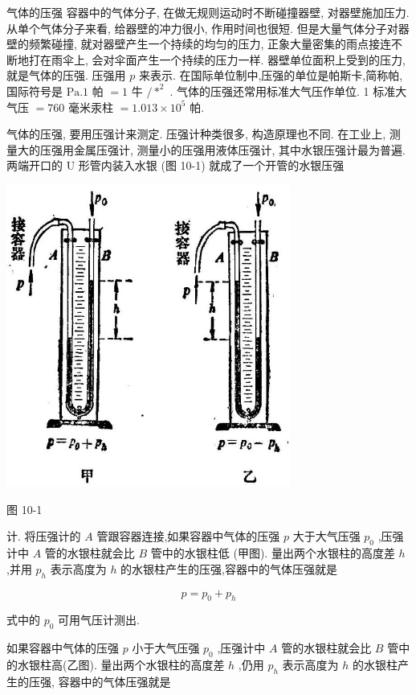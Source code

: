 \documentclass[10pt]{article}
\begin{document}
气体的压强 容器中的气体分子, 在做无规则运动时不断碰撞器壁, 对器壁施加压力. 从单个气体分子来看, 给器壁的冲力很小, 作用时间也很短. 但是大量气体分子对器壁的频繁碰撞, 就对器壁产生一个持续的均匀的压力, 正象大量密集的雨点接连不断地打在雨伞上, 会对伞面产生一个持续的压力一样. 器壁单位面积上受到的压力, 就是气体的压强. 压强用 \(p\) 来表示. 在国际单位制中,压强的单位是帕斯卡,简称帕,国际符号是 \(\mathrm{{Pa}}{.1}\) 帕 \(= 1\) 牛 \(/{ * }^{2}\) . 气体的压强还常用标准大气压作单位. 1 标准大气压 \(= {760}\) 毫米汞柱 \(= {1.013} \times {10}^{5}\) 帕.

气体的压强, 要用压强计来测定. 压强计种类很多, 构造原理也不同. 在工业上, 测量大的压强用金属压强计, 测量小的压强用液体压强计, 其中水银压强计最为普遍. 两端开口的 \(\mathrm{U}\) 形管内装入水银 (图 10-1) 就成了一个开管的水银压强

\begin{center}
\includegraphics[max width=0.7\textwidth]{images/01912d55-147c-70aa-b0e0-1782a122f948_279_865491.jpg}
\end{center}

图 10-1

计. 将压强计的 \(A\) 管跟容器连接,如果容器中气体的压强 \(p\) 大于大气压强 \({p}_{0}\) ,压强计中 \(A\) 管的水银柱就会比 \(B\) 管中的水银柱低 (甲图). 量出两个水银柱的高度差 \(h\) ,并用 \({p}_{h}\) 表示高度为 \(h\) 的水银柱产生的压强,容器中的气体压强就是

\[
p = {p}_{0} + {p}_{h}
\]

式中的 \({p}_{0}\) 可用气压计测出.

如果容器中气体的压强 \(p\) 小于大气压强 \({p}_{0}\) ,压强计中 \(A\) 管的水银柱就会比 \(B\) 管中的水银柱高(乙图). 量出两个水银柱的高度差 \(h\) ,仍用 \({p}_{h}\) 表示高度为 \(h\) 的水银柱产生的压强, 容器中的气体压强就是
\end{document}
